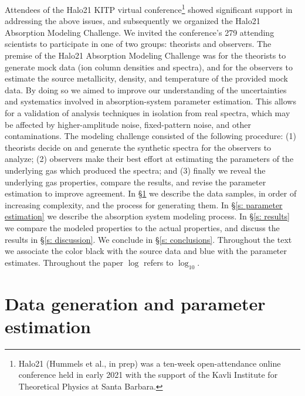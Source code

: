 \documentclass[fleqn,usenatbib]{mnras}
\begin{document}
Attendees of the Halo21 KITP virtual conference\footnote{Halo21 (Hummels et al., in prep) was a ten-week open-attendance online conference held in early 2021 with the support of the Kavli Institute for Theoretical Physics at Santa Barbara.}
showed significant support in addressing the above issues, and subsequently we organized the Halo21 Absorption Modeling Challenge.
We invited the conference's 279 attending scientists to participate in one of two groups:
theorists and observers.
The premise of the Halo21 Absorption Modeling Challenge was for the theorists to generate mock data (ion column densities and spectra), and for the observers to estimate the source metallicity, density, and temperature of the provided mock data.
By doing so we aimed to improve our understanding of the uncertainties and systematics involved in absorption-system parameter estimation.
This allows for a validation of analysis techniques in isolation from real spectra,
which may be affected by higher-amplitude noise, fixed-pattern noise, and other contaminations.
The modeling challenge consisted of the following procedure:
(1) theorists decide on and generate the synthetic spectra for the observers to analyze; (2) observers make their best effort at estimating the parameters of the underlying gas which produced the spectra; and (3) finally we reveal the underlying gas properties, compare the results, and revise the parameter estimation to improve agreement.
In \S\ref{s: data generation} we describe the data samples, in order of increasing complexity, and the process for generating them.
In \S\ref{s:  parameter estimation} we describe the absorption system modeling process.
In \S\ref{s: results} we compare the modeled properties to the actual properties, and discuss the results in \S\ref{s: discussion}.
We conclude in \S\ref{s: conclusions}.
Throughout the text we associate the color black with the source data and
blue with the parameter estimates.
Throughout the paper $\log$ refers to $\log_{10}$.

\section{Data generation and parameter estimation}
\label{s: data generation}
\end{document}
